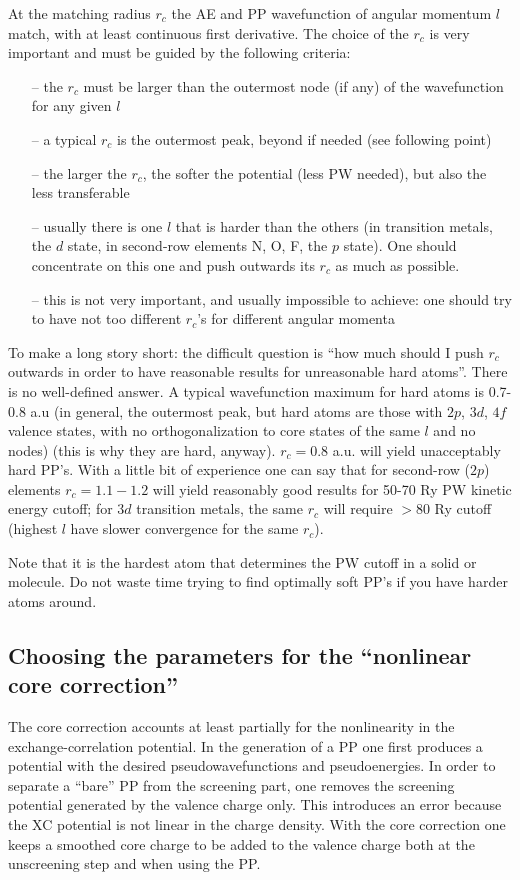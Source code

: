 At the matching radius $r_c$ the AE and PP wavefunction
of angular momentum $l$ match, with at least continuous first
derivative. The choice of the $r_c$ is very important and must be
guided by the following criteria: 
\begin{enumerate}
\item[--] the $r_c$ must be larger than the outermost node (if any)
of the wavefunction for any given $l$
\item[--] a typical $r_c$ is the outermost peak, beyond if needed
(see following point)
\item[--] the larger the $r_c$, the softer the potential (less PW
needed), but also the less transferable
\item[--] usually there is one $l$ that is harder than the others
(in transition metals, the $d$ state, in second-row elements N, O, F, 
the $p$ state). One should concentrate on this one and push outwards 
its $r_c$ as much as possible.
\item[--] this is not very important, and usually impossible to
achieve: one should try to have not too different $r_c$'s for
different angular momenta
\end{enumerate}
To make a long story short: the difficult question is ``how much
should I push $r_c$ outwards in order to have reasonable results for
unreasonable hard atoms''. There is no well-defined answer. A typical
wavefunction maximum for hard atoms is 0.7-0.8 a.u (in general, the
outermost peak, but hard atoms are those with $2p$, $3d$, $4f$ valence
states, with no orthogonalization to core states of the same $l$ and
no nodes) (this is why they are hard, anyway). $r_c=0.8$ a.u. will
yield unacceptably hard PP's. With a little bit of experience one can
say that for second-row ($2p$) elements $r_c=1.1-1.2$ will yield
reasonably good results for 50-70 Ry PW kinetic energy cutoff; for
$3d$ transition metals, the same $r_c$ will require $> 80$ Ry cutoff
(highest $l$ have slower convergence for the same $r_c$).

Note that it is the hardest atom that determines the PW cutoff in a
solid or molecule. Do not waste time trying to find optimally soft 
PP's if you have harder atoms around.

\subsection{Choosing the parameters for the ``nonlinear core correction''}

The core correction accounts at least partially for the nonlinearity
in the exchange-correlation potential. In the generation of a PP one
first produces a potential with the desired pseudowavefunctions and
pseudoenergies. In order to separate a ``bare'' PP from the screening
part, one removes the screening potential generated by the valence
charge only. This introduces an error because the XC potential is not
linear in the charge density. With the core correction one keeps a  
smoothed core charge to be added to the valence charge both at the
unscreening step and when using the PP.

